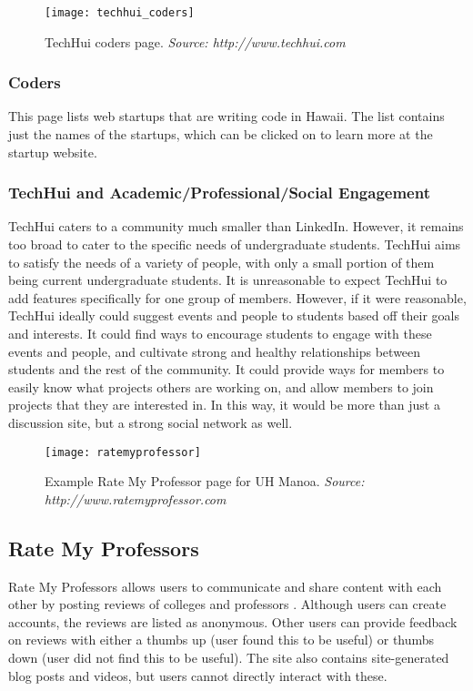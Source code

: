 \begin{figure}[h]
\centering
\texttt{[image: techhui\_coders]}
\caption{TechHui coders page. \textit{Source: http://www.techhui.com}}
\end{figure}
\subsubsection{Coders}
This page lists web startups that are writing code in Hawaii. The list contains just the names of the startups, which can be clicked on to learn more at the startup website.

\subsubsection{TechHui and Academic/Professional/Social Engagement}
TechHui caters to a community much smaller than LinkedIn. However, it remains too broad to cater to the specific needs of undergraduate students. TechHui aims to satisfy the needs of a variety of people, with only a small portion of them being current undergraduate students. It is unreasonable to expect TechHui to add features specifically for one group of members. However, if it were reasonable, TechHui ideally could suggest events and people to students based off their goals and interests. It could find ways to encourage students to engage with these events and people, and cultivate strong and healthy relationships between students and the rest of the community. It could provide ways for members to easily know what projects others are working on, and allow members to join projects that they are interested in. In this way, it would be more than just a discussion site, but a strong social network as well. 

\begin{figure}[h]
\centering
\texttt{[image: ratemyprofessor]}
\caption{Example Rate My Professor page for UH Manoa. \textit{Source: http://www.ratemyprofessor.com}}
\end{figure}
\subsection{Rate My Professors}
Rate My Professors allows users to communicate and share content with each other by posting reviews of colleges and professors  \cite{RateMyProfessors}. Although users can create accounts, the reviews are listed as anonymous. Other users can provide feedback on reviews with either a thumbs up (user found this to be useful) or thumbs down (user did not find this to be useful). The site also contains site-generated blog posts and videos, but users cannot directly interact with these.

